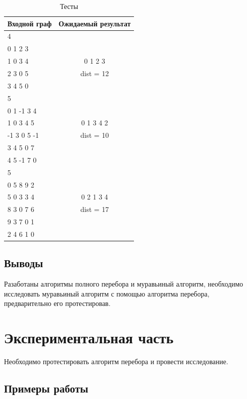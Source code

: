 \documentclass[a4paper,12pt]{article}
\begin{document}
\begin{table}[H]
    \caption{Тесты}
    \label{table:test}
    \centering
    \begin{tabular}{|l||c|}
        \hline
        Входной граф & Ожидаемый результат \\
        \hline
        \hline
        \hline
        4 & \\
        0 1 2 3 & \\
        1 0 3 4 & 0 1 2 3 \\
        2 3 0 5 & dist = 12 \\
        3 4 5 0 & \\
        \hline
        5 & \\
        0 1 -1 3 4 & \\
        1 0 3 4 5 & 0 1 3 4 2 \\
        -1 3 0 5 -1 & dist = 10 \\
        3 4 5 0 7 & \\
        4 5 -1 7 0 & \\
        \hline
        5 & \\
        0 5 8 9 2 & \\
        5 0 3 3 4 & 0 2 1 3 4 \\
        8 3 0 7 6 & dist = 17 \\
        9 3 7 0 1 & \\
        2 4 6 1 0 & \\
        \hline
    \end{tabular}
\end{table}

\subsection{Выводы}

Разаботаны алгоритмы полного перебора и муравьиный алгоритм, необходимо исследовать муравьиный алгоритм
с помощью алгоритма перебора, предварительно его протестировав.

\newpage
\section{Экспериментальная часть}

Необходимо протестировать алгоритм перебора и провести исследование.

\subsection{Примеры работы}
\end{document}
